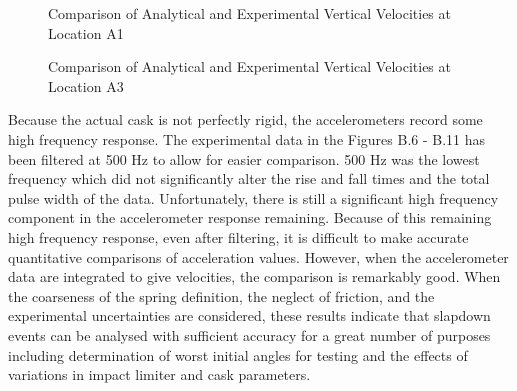 \begin{figure}
\vspace{3.5 in}
\caption{Comparison of Analytical and Experimental Vertical
Velocities at Location A1}
\end{figure}

\begin{figure}
\vspace{3.5 in}
\caption{Comparison of Analytical and Experimental Vertical
Velocities at Location A3}
\end{figure}

Because the actual
cask is not perfectly rigid, the accelerometers record some high
frequency response.  The experimental data in the Figures B.6 -
B.11 has been filtered at 500 Hz to allow for easier comparison.  500
Hz was the lowest frequency which did not significantly alter the
rise and fall times and the total pulse width of the data.
Unfortunately, there
is still a significant high frequency component in the accelerometer
response remaining.
Because of this remaining high frequency response, even after
filtering, it is difficult to make accurate quantitative comparisons
of acceleration values. However, when the accelerometer data are
integrated to give velocities, the comparison is remarkably good.
When the coarseness of the spring definition, the neglect of friction,
and the experimental uncertainties are considered, these results
indicate that slapdown events can be analysed with sufficient accuracy
for a great number of purposes including determination of worst
initial angles for testing and the effects of variations in impact
limiter and cask parameters.
